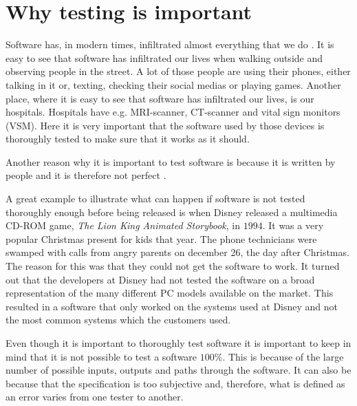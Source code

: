 \section{Why testing is important} \label{sec:whytesting}
Software has, in modern times, infiltrated almost everything that we do \cite{SoftwareTesting}.
It is easy to see that software has infiltrated our lives when walking outside and observing people in the street.
A lot of those people are using their phones, either talking in it or, texting, checking their social medias or playing games.
Another place, where it is easy to see that software has infiltrated our lives, is our hospitals.
Hospitals have e.g. MRI-scanner, CT-scanner and vital sign monitors (VSM).
Here it is very important that the software used by those devices is thoroughly tested to make sure that it works as it should.

Another reason why it is important to test software is because it is written by people and it is therefore not perfect \cite{SoftwareTesting}.

A great example to illustrate what can happen if software is not tested thoroughly enough before being released is when Disney released a multimedia CD-ROM game, \textit{The Lion King Animated Storybook}, in $1994$.
It was a very popular Christmas present for kids that year.
The phone technicians were swamped with calls from angry parents on december 26, the day after Christmas.
The reason for this was that they could not get the software to work. %
It turned out that the developers at Disney had not tested the software on a broad representation of the many different PC models available on the market.
This resulted in a software that only worked on the systems used at Disney and not the most common systems which the customers used. \cite{SoftwareTesting}

Even though it is important to thoroughly test software it is important to keep in mind that it is not possible to test a software $100\%$.
This is because of the large number of possible inputs, outputs and paths through the software.
It can also be because that the specification is too subjective and, therefore, what is defined as an error varies from one tester to another. \cite{SoftwareTesting}
